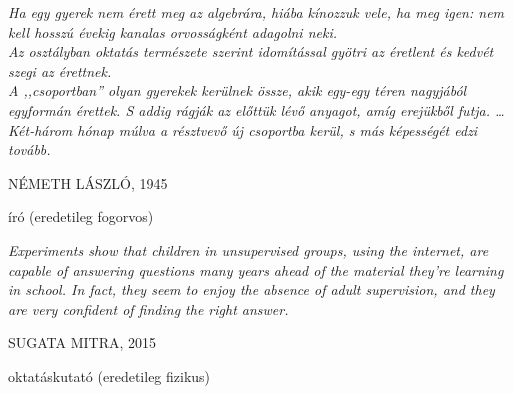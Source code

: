 \newlength\longest
\cleardoublepage
\thispagestyle{empty}
\null\vfill
{\centering
\parbox{0.8\textwidth} {%
    \raggedright{\large\itshape%
    Ha egy gyerek nem érett meg az algebrára, hiába kínozzuk vele,  
    ha meg igen: nem kell hosszú évekig kanalas orvosságként adagolni neki. \\
    Az osztályban oktatás természete szerint idomítással gyötri az éretlent 
    és kedvét szegi az érettnek. \\
    A ,,csoportban'' olyan gyerekek kerülnek össze, akik egy-egy téren 
    nagyjából egyformán érettek. S addig rágják az előttük lévő anyagot, amíg erejükből futja. \ldots Két-három hónap múlva a résztvevő új csoportba kerül, s más képességét edzi tovább.

        \par\bigskip
    }
    \raggedleft\Large\MakeUppercase{Németh László, 1945}\par%
    \raggedleft\normalsize{író (eredetileg fogorvos)}\par%
}\par%
}
\vfill\vfill
\cleardoublepage
\thispagestyle{empty}
\null\vfill
{\centering
\parbox{0.8\textwidth} {%
    \raggedright{\large\itshape%
    Experiments show that children in unsupervised groups, using the internet, are capable of answering questions many years ahead of the material they’re learning in school. In fact, they seem to enjoy the absence of adult supervision, and they are very confident of finding the right answer.

        \par\bigskip
    }
    \raggedleft\Large\MakeUppercase{Sugata Mitra, 2015}\par%
    \raggedleft\normalsize{oktatáskutató (eredetileg fizikus)}\par%
}\par%
}

\vfill\vfill
\clearpage

